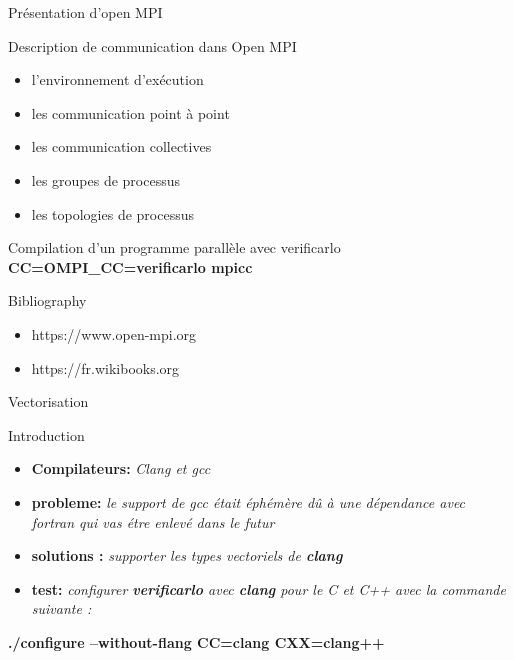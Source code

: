 \documentclass{beamer}
\begin{document}
\begin{frame}{Présentation d'open MPI}
    \begin{block}{Description de communication dans Open MPI}
      \begin{itemize}
          \item l’environnement d’exécution
          \item les communication point à point
          \item les communication collectives
          \item les groupes de processus
          \item les topologies de processus
      \end{itemize}
    \end{block}
    
    \begin{block}{Compilation d’un programme parallèle avec verificarlo}
      \textbf{CC=OMPI\_CC=verificarlo mpicc}
    \end{block}
    \begin{block}{Bibliography}
        \begin{itemize}
            \item https://www.open-mpi.org
            \item https://fr.wikibooks.org
        \end{itemize}      
    \end{block}
\end{frame}

\begin{frame}{Vectorisation}
\begin{block}{Introduction }
    \begin{itemize}
        \item \textbf{Compilateurs:} \textit{ Clang et gcc} 
        \item \textbf{probleme:} \textit{  le support de
gcc était éphémère dû à une dépendance avec fortran qui vas étre enlevé dans le futur}
         \item \textbf{solutions : } \textit{supporter les types vectoriels de \textbf{clang} }
         \item \textbf{test: } \textit{ configurer \textbf{verificarlo} avec \textbf {clang} pour le C et C++ avec la commande suivante : }
         \end{itemize}
         \begin{center}
        \textbf{\color{blue} ./configure --without-flang CC=clang CXX=clang++ }      
          \end{center}
  \end{block}
\end{frame}
\end{document}
